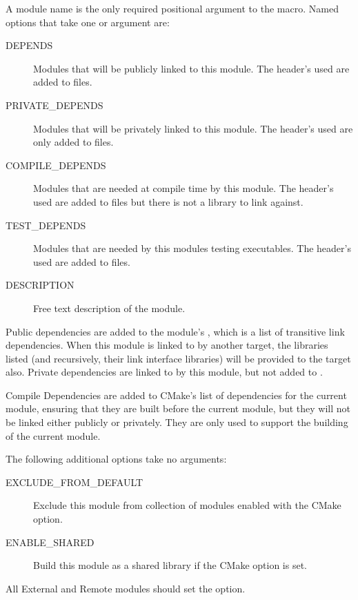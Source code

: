 A module name is the only required positional argument to the
 macro. Named options that take one or argument are:

\begin{description}
  \item[DEPENDS]          Modules that will be publicly linked to this module.
    The header's used are added to  files.
  \item[PRIVATE\_DEPENDS] Modules that will be privately linked to this
    module. The header's used are only added to  files.
  \item[COMPILE\_DEPENDS] Modules that are needed at compile time by this module.
    The header's used are added to  files but there
    is not a library to link against.
  \item[TEST\_DEPENDS]    Modules that are needed by this modules testing executables.
    The header's used are added to  files.
  \item[DESCRIPTION]      Free text description of the module.
\end{description}

Public dependencies are added to the module's
, which is a list of transitive link
dependencies.  When this module is linked to by another target, the libraries
listed (and recursively, their link interface libraries) will be provided to
the target also. Private dependencies are linked to by this module, but not
added to .

Compile Dependencies are added to CMake's list of dependencies for the current
module, ensuring that they are built before the current module, but they will
not be linked either publicly or privately. They are only used to support the
building of the current module.

The following additional options take no arguments:

\begin{description}
  \item[EXCLUDE\_FROM\_DEFAULT] Exclude this module from collection of modules
    enabled with the  CMake option.
  \item[ENABLE\_SHARED]         Build this module as a shared library if the
     CMake option is set.
\end{description}

All External and Remote modules should set the 
option.


